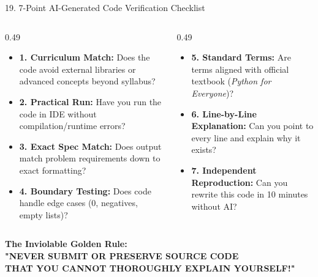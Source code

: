 \documentclass[aspectratio=169, 10pt]{beamer}
\begin{document}
\begin{frame}{19. 7-Point AI-Generated Code Verification Checklist}
  \begin{columns}[T]
    \begin{column}{0.49\textwidth}
      \footnotesize
      \begin{itemize}\setlength{\itemsep}{3pt}
        \item[$\square$] \textbf{1. Curriculum Match:} Does the code avoid external libraries or advanced concepts beyond syllabus?
        \item[$\square$] \textbf{2. Practical Run:} Have you run the code in IDE without compilation/runtime errors?
        \item[$\square$] \textbf{3. Exact Spec Match:} Does output match problem requirements down to exact formatting?
        \item[$\square$] \textbf{4. Boundary Testing:} Does code handle edge cases (0, negatives, empty lists)?
      \end{itemize}
    \end{column}
    \begin{column}{0.49\textwidth}
      \footnotesize
      \begin{itemize}\setlength{\itemsep}{3pt}
        \item[$\square$] \textbf{5. Standard Terms:} Are terms aligned with official textbook (\textit{Python for Everyone})?
        \item[$\square$] \textbf{6. Line-by-Line Explanation:} Can you point to every line and explain why it exists?
        \item[$\square$] \textbf{7. Independent Reproduction:} Can you rewrite this code in 10 minutes without AI?
      \end{itemize}
    \end{column}
  \end{columns}
  \vspace{0.15cm}
  \begin{tcolorbox}[colback=accentorange!15, colframe=accentorange, arc=3pt, left=8pt, right=8pt, top=3pt, bottom=3pt]
    \centering\footnotesize
    \textbf{The Inviolable Golden Rule:}\\[2pt]
    \textbf{"NEVER SUBMIT OR PRESERVE SOURCE CODE\\THAT YOU CANNOT THOROUGHLY EXPLAIN YOURSELF!"}
  \end{tcolorbox}
\end{frame}
\end{document}
